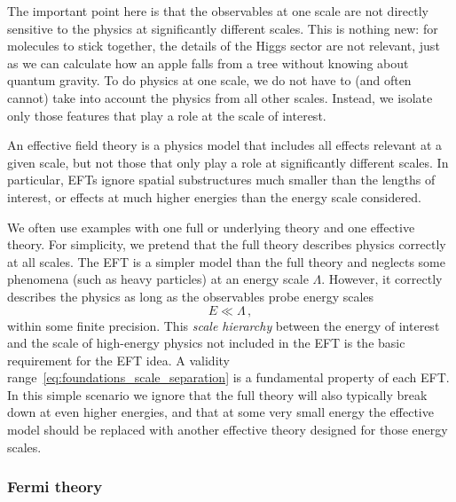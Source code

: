 The important point here is that the observables at one scale are not
directly sensitive to the physics at significantly different
scales. This is nothing new: for molecules to stick together, the
details of the Higgs sector are not relevant, just as we can calculate how
an apple falls from a tree without knowing about quantum gravity. To
do physics at one scale, we do not have to (and often cannot) take
into account the physics from all other scales. Instead, we isolate
only those features that play a role at the scale of interest.

An effective field theory is a physics model that includes all effects
relevant at a given scale, but not those that only play a role at
significantly different scales. In particular, EFTs ignore spatial
substructures much smaller than the lengths of interest, or effects at
much higher energies than the energy scale considered.

We often use examples with one full or underlying theory and
one effective theory. For simplicity, we pretend that the full theory
describes physics correctly at all scales. The EFT is a simpler model
than the full theory and neglects some phenomena (such as heavy
particles) at an energy scale $\Lambda$. However, it correctly describes
the physics as long as the observables probe energy scales
%
\begin{equation}
  E \ll \Lambda \,,
  \label{eq:foundations_scale_separation}
\end{equation}
%
within some finite precision. This \emph{scale hierarchy} between the
energy of interest and the scale of high-energy physics not included
in the EFT is the basic requirement for the EFT idea. A validity
range~\eqref{eq:foundations_scale_separation} is a fundamental
property of each EFT. In this simple scenario we ignore that the full
theory will also typically break down at even higher energies, and
that at some very small energy the effective model should be replaced
with another effective theory designed for those energy scales.



\subsubsection{Fermi theory}


